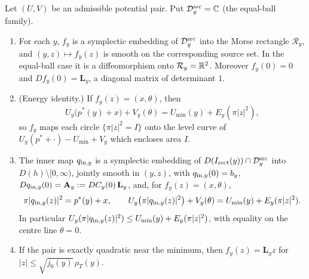 \begin{theorem}\label{thm:pln-inner}
Let $(U,V)$ be an admissible potential pair. Put $\mathcal D_y^{\rm src}=\mathbb{C}$ (the equal-ball family).
\begin{enumerate}[label=(\alph*)]
\item For each $y$, $f_y$ is a symplectic embedding of $\mathcal D_y^{\rm src}$ into the Morse rectangle
 $\mathcal R_y$, and $(y,z)\mapsto f_y(z)$ is smooth on the corresponding source set. In the equal-ball case it is a diffeomorphism onto $\mathcal R_y=\mathbb{R}^2$. Moreover
 $f_y(0)=0$ and $Df_y(0)=\mathbf L_y$, a diagonal matrix of determinant $1$.
\item (Energy identity.) If $f_y(z)=(x,\theta)$, then
 \[
  U_y\bigl(p^*(y)+x\bigr)+V_y(\theta)=U_{\min}(y)+E_y(\pi|z|^2),
 \]
 so $f_y$ maps each circle $\{\pi|z|^2=I\}$ onto the level curve of $U_y(p^*+\cdot)-U_{\min}+V_y$ which encloses area $I$.
\item The inner map $q_{{\rm in},y}$ is a symplectic embedding of $D(I_{\rm rect}(y))\cap\mathcal D_y^{\rm src}$ into
 $D(h)\setminus[0,\infty)$, jointly smooth in $(y,z)$, with $q_{{\rm in},y}(0)=b_y$,
 $Dq_{{\rm in},y}(0)=\mathbf A_y:=DC_y(0)\,\mathbf L_y$, and, for $f_y(z)=(x,\theta)$,
 \[
  \pi|q_{{\rm in},y}(z)|^2=p^*(y)+x,\qquad
  U_y\bigl(\pi|q_{{\rm in},y}(z)|^2\bigr)+V_y(\theta)=U_{\min}(y)+E_y(\pi|z|^2).
 \]
 In particular $U_y(\pi|q_{{\rm in},y}(z)|^2)\le U_{\min}(y)+E_y(\pi|z|^2)$, with equality on the centre line $\theta=0$.
\item If the pair is exactly quadratic near the minimum, then $f_y(z)=\mathbf L_yz$ for
 $|z|\le\sqrt{j_0(y)}\,\rho_T(y)$.
\end{enumerate}
\end{theorem}

